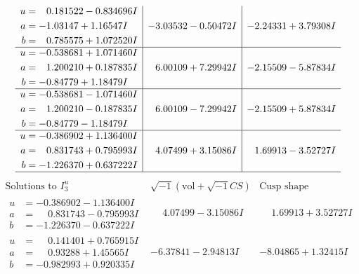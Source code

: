 \documentclass[1p]{elsarticle_modified}
\theoremstyle{definition}
\newcommand{\I}{\sqrt{-1}}
\begin{document}
$$\begin{array}{c|c|c}
\begin{aligned}
u &= \phantom{-}0.181522 - 0.834696 I \\
a &= -1.03147 + 1.16547 I \\
b &= \phantom{-}0.785575 + 1.072520 I\end{aligned}
 & -3.03532 - 0.50472 I & -2.24331 + 3.79308 I \\ \hline\begin{aligned}
u &= -0.538681 + 1.071460 I \\
a &= \phantom{-}1.200210 + 0.187835 I \\
b &= -0.84779 + 1.18479 I\end{aligned}
 & \phantom{-}6.00109 + 7.29942 I & -2.15509 - 5.87834 I \\ \hline\begin{aligned}
u &= -0.538681 - 1.071460 I \\
a &= \phantom{-}1.200210 - 0.187835 I \\
b &= -0.84779 - 1.18479 I\end{aligned}
 & \phantom{-}6.00109 - 7.29942 I & -2.15509 + 5.87834 I \\ \hline\begin{aligned}
u &= -0.386902 + 1.136400 I \\
a &= \phantom{-}0.831743 + 0.795993 I \\
b &= -1.226370 + 0.637222 I\end{aligned}
 & \phantom{-}4.07499 + 3.15086 I & \phantom{-}1.69913 - 3.52727 I\\
 \hline 
 \end{array}$$\newpage$$\begin{array}{c|c|c}  
\text{Solutions to }I^u_{3}& \I (\text{vol} + \sqrt{-1}CS) & \text{Cusp shape}\\
 \hline 
\begin{aligned}
u &= -0.386902 - 1.136400 I \\
a &= \phantom{-}0.831743 - 0.795993 I \\
b &= -1.226370 - 0.637222 I\end{aligned}
 & \phantom{-}4.07499 - 3.15086 I & \phantom{-}1.69913 + 3.52727 I \\ \hline\begin{aligned}
u &= \phantom{-}0.141401 + 0.765915 I \\
a &= \phantom{-}0.93288 + 1.45565 I \\
b &= -0.982993 + 0.920335 I\end{aligned}
 & -6.37841 - 2.94813 I & -8.04865 + 1.32415 I \\ \hline\begin{aligned}

\end{aligned}
\end{array}$$
\end{document}

